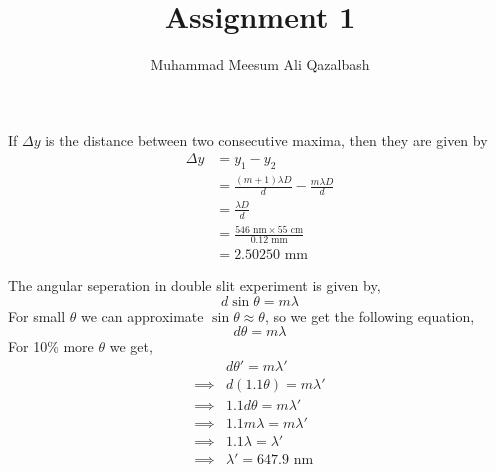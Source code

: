 \documentclass{article}
\title{Assignment 1}
\author{Muhammad Meesum Ali Qazalbash}
\begin{document}
\maketitle

\begin{problem}
If \(\Delta y\) is the distance between two consecutive maxima, then they are given by
\begin{align*}
	\Delta y & = y_1 - y_2                                                \\
	         & = \frac{(m+1)\lambda D}{d} - \frac{m\lambda D}{d}          \\
	         & = \frac{\lambda D}{d}                                      \\
	         & = \frac{546 \text{ nm}\times 55\text{ cm}}{0.12\text{ mm}} \\
	         & = 2.50250 \text{ mm}
\end{align*}

\end{problem}

\begin{problem}
The angular seperation in double slit experiment is given by,
\[d\sin{\theta}=m\lambda\]
For small \(\theta\) we can approximate \(\sin{\theta}\approx\theta\), so we get the following equation,
\[d\theta=m\lambda\]
For 10\% more \(\theta\) we get,
\begin{align*}
	         & d\theta'=m\lambda'        \\
	\implies & d(1.1\theta)=m\lambda'    \\
	\implies & 1.1d\theta=m\lambda'      \\
	\implies & 1.1m\lambda=m\lambda'     \\
	\implies & 1.1\lambda=\lambda'       \\
	\implies & \lambda'= 647.9\text{ nm}
\end{align*}

\end{problem}

\newpage
\end{document}

